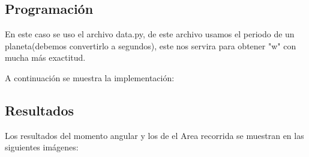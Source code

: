 \documentclass[a4paper,12pt]{article}
\begin{document}
    \subsection{Programación}
    En este caso se uso el archivo data.py, de este archivo usamos
    el periodo de un planeta(debemos convertirlo a segundos), 
    este nos servira para obtener "w" con mucha más exactitud.
    
    A continuación se muestra la implementación:

    

    \subsection{Resultados}
    Los resultados del momento angular y los de el Area recorrida se
    muestran en las siguientes imágenes:
\end{document}
